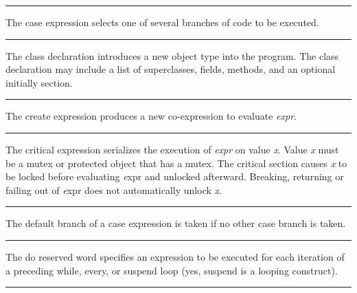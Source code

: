 \bigskip\hrule\vspace{0.1cm}

\noindent
The \textsf{case} expression selects one of
several branches of code to be executed.

\bigskip\hrule\vspace{0.1cm}

\noindent
{}The \textsf{class} declaration introduces a new
object type into the program. The \textsf{class} declaration may
include a list of superclasses, fields, methods, and an optional
initially section.

\bigskip\hrule\vspace{0.1cm}

\noindent
{}The \textsf{create} expression produces a new
co-expression to evaluate \textit{expr}.

\bigskip\hrule\vspace{0.1cm}

\noindent
{}The \textsf{critical} expression serializes the
execution of \textit{expr} on value {\textit x}. Value {\textit x} must
be a mutex or protected object that has a mutex. The critical section
causes {\textit x} to be locked before evaluating {\textit expr} and
unlocked afterward. Breaking, returning or failing out of {\textit expr} 
does not automatically unlock {\textit x}.

\bigskip\hrule\vspace{0.1cm}

\noindent
{}The \textsf{default} branch of a case
expression is taken if no other case branch is taken.

\bigskip\hrule\vspace{0.1cm}

\noindent
{}The \textsf{do} reserved word specifies an
expression to be executed for each iteration of a preceding
\textsf{while}, \textsf{every}, or \textsf{suspend} loop (yes,
\textsf{suspend} is a looping construct).

\bigskip\hrule\vspace{0.1cm}

